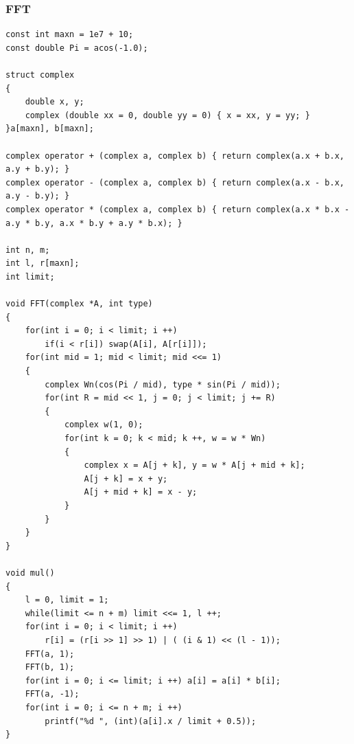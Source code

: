 \documentclass[twoside]{article}
\begin{document}
\subsubsection{FFT}
\begin{lstlisting}
const int maxn = 1e7 + 10;
const double Pi = acos(-1.0);

struct complex
{
	double x, y;
	complex (double xx = 0, double yy = 0) { x = xx, y = yy; }
}a[maxn], b[maxn];

complex operator + (complex a, complex b) { return complex(a.x + b.x, a.y + b.y); }
complex operator - (complex a, complex b) { return complex(a.x - b.x, a.y - b.y); }
complex operator * (complex a, complex b) { return complex(a.x * b.x - a.y * b.y, a.x * b.y + a.y * b.x); }

int n, m;
int l, r[maxn];
int limit;

void FFT(complex *A, int type)
{
	for(int i = 0; i < limit; i ++)
		if(i < r[i]) swap(A[i], A[r[i]]);
	for(int mid = 1; mid < limit; mid <<= 1)
	{
		complex Wn(cos(Pi / mid), type * sin(Pi / mid));
		for(int R = mid << 1, j = 0; j < limit; j += R)
		{
			complex w(1, 0);
			for(int k = 0; k < mid; k ++, w = w * Wn)
			{
				complex x = A[j + k], y = w * A[j + mid + k];
				A[j + k] = x + y;
				A[j + mid + k] = x - y;
			}
		}
	}
}

void mul()
{
	l = 0, limit = 1;
	while(limit <= n + m) limit <<= 1, l ++;
	for(int i = 0; i < limit; i ++)
		r[i] = (r[i >> 1] >> 1) | ( (i & 1) << (l - 1));
	FFT(a, 1);
	FFT(b, 1);
	for(int i = 0; i <= limit; i ++) a[i] = a[i] * b[i];
	FFT(a, -1);
	for(int i = 0; i <= n + m; i ++)
		printf("%d ", (int)(a[i].x / limit + 0.5));
}\end{lstlisting}
\end{document}
